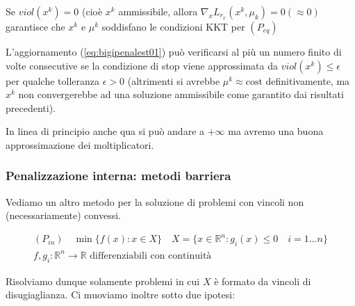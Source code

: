 \begin{observation}
 Se $viol(x^{k}) = 0$ (cio\`e $x^{k}$ ammissibile, allora
$\nabla_{x} L_{r_x}(x^{k}, \mu_k) = 0 (\approx 0)$ garantisce
che $x^{k}$ e $\mu^{k}$ soddisfano le condizioni KKT per
$(P_{eq})$
\end{observation}
\begin{observation}
 L'aggiornamento (\ref{eq:bigipenalest01}) pu\`o verificarsi al pi\`u un numero
finito di volte consecutive se la condizione di stop
viene approssimata da $viol(x^{k})\leq \epsilon$ per qualche
tolleranza $\epsilon > 0 $ (altrimenti si avrebbe $\mu^{k}
\approx \text{cost}$ definitivamente, ma $x^{k}$ non convergerebbe
ad una soluzione ammissibile come garantito dai risultati
 precedenti). 
\end{observation}
In linea di principio anche qua si pu\`o andare a
$+ \infty$ ma avremo una buona approssimazione
dei moltiplicatori.



\subsubsection{Penalizzazione interna: metodi barriera}
Vediamo un altro metodo per la soluzione di problemi con vincoli non (necessariamente) convessi.

$$
\begin{array}{c}
(P_{in})\quad \min \{f(x) : x \in X \} \quad X = \{x \in \mathbb{R}^{n} :
g_i(x) \leq 0 \quad i = 1 \ldots n \} \\
 f,g_i: \mathbb{R}^{n} \rightarrow \mathbb{R}  \text{ differenziabili con continuit\`a }
\end{array}
$$

Risolviamo dunque solamente problemi in cui $X$ è formato da vincoli di disugiaglianza. Ci muoviamo inoltre sotto due ipotesi:

